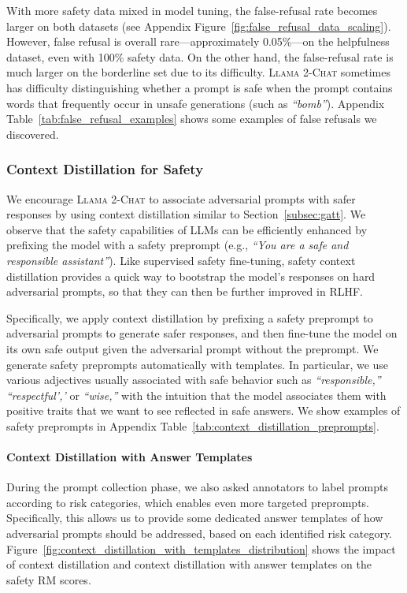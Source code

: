 With more safety data mixed in model tuning, the false-refusal rate becomes larger on both datasets (see Appendix Figure~\ref{fig:false_refusal_data_scaling}). However,  false refusal is overall rare---approximately 0.05\%---on the helpfulness dataset, even with 100\% safety data. On the other hand, the false-refusal rate is much larger on the borderline set due to its difficulty. \textsc{Llama 2-Chat} sometimes has difficulty distinguishing whether a prompt is safe when the prompt contains words that frequently occur in unsafe generations (such as \textit{``bomb''}). Appendix Table~\ref{tab:false_refusal_examples} shows some examples of false refusals we discovered. 

\subsubsection{Context Distillation for Safety}

We encourage \textsc{Llama 2-Chat} to associate adversarial prompts with safer responses by using context distillation \citep{askell-etal-2021-general} similar to Section~\ref{subsec:gatt}.
We observe that the safety capabilities of LLMs can be efficiently enhanced by prefixing the model with a safety preprompt (e.g., \textit{``You are a safe and responsible assistant''}). Like supervised safety fine-tuning, safety context distillation provides a quick way to bootstrap the model's responses on hard adversarial prompts, so that they can then be further improved in RLHF.

Specifically, we apply context distillation by prefixing a safety preprompt to adversarial prompts to generate safer responses, and then fine-tune the model on its own safe output given the adversarial prompt without the preprompt. We generate safety preprompts automatically with templates. In particular, we use various adjectives usually associated with safe behavior such as \textit{``responsible,''} \textit{``respectful','} or \textit{``wise,''} with the intuition that the model associates them with positive traits that we want to see reflected in safe answers. We show examples of safety preprompts in Appendix Table~\ref{tab:context_distillation_preprompts}.

\paragraph{Context Distillation with Answer Templates} During the prompt collection phase, we also asked annotators to label prompts according to risk categories, which enables even more targeted preprompts. Specifically, this allows us to provide some dedicated answer templates of how adversarial prompts should be addressed, based on each identified risk category.
Figure~\ref{fig:context_distillation_with_templates_distribution} shows the impact of context distillation and context distillation with answer templates on the safety RM scores.

